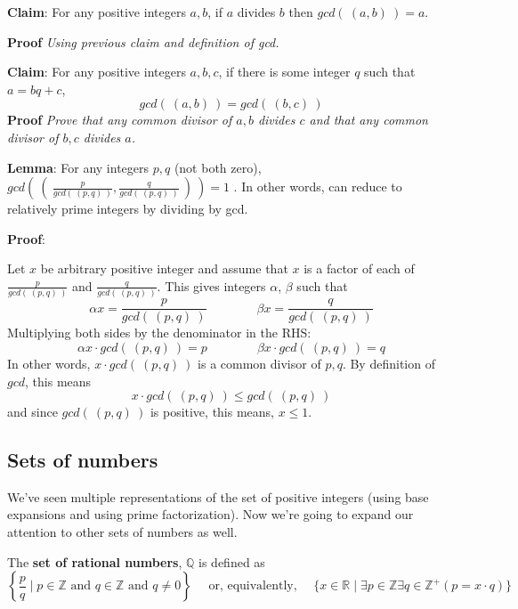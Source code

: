 \documentclass[12pt, oneside]{article}
\begin{document}
\vspace{150pt}

{\bf Claim}: For any positive integers $a,b$, if $a$ divides $b$ then $gcd(~(a,b)~) = a$.

{\bf Proof} {\it Using previous claim and definition of gcd.}

\vspace{150pt}


{\bf Claim}: For any positive integers $a,b,c$, if there is some integer $q$ such that $a = bq + c$,
\[
    gcd(~(a,b)~) = gcd (~(b,c)~)
\]
{\bf Proof} {\it Prove that any common divisor of $a,b$ divides $c$ and that any common 
divisor of $b,c$ divides $a$.}

\vspace{150pt}
 

{\bf Lemma}: For any integers $p, q$ (not both zero), 
$gcd \left(~ \left(~\frac{p}{gcd(~(p,q)~)}, \frac{q}{gcd(~(p,q)~)} ~\right) ~\right) = 1$ .
In other words, can reduce to relatively prime integers by dividing by gcd.

{\bf Proof}:

Let $x$ be arbitrary positive integer and assume that $x$ is a 
factor of each of $\frac{p}{gcd(~(p,q)~)}$ and $\frac{q}{gcd(~(p,q)~)}$. 
This gives integers $\alpha$, $\beta$ such that 
\[
    \alpha x = \frac{p}{gcd(~(p,q)~)} \qquad \qquad \beta x = \frac{q}{gcd(~(p,q)~)}
\]
Multiplying both sides by the denominator in the RHS: 
\[
    \alpha x \cdot gcd(~(p,q)~)= p \qquad \qquad \beta x \cdot gcd(~(p,q)~)= q
\]
In other words, $x \cdot gcd(~(p,q)~)$ is a common divisor of $p, q$. By definition of $gcd$, this means
\[
    x \cdot gcd (~(p,q)~) \leq gcd (~(p,q)~)
\]
and since $gcd(~(p,q)~)$ is positive, this means, $x \leq 1$.
\vspace{350pt}
 
\newpage
\subsection*{Sets of numbers}

We've seen multiple representations of the set of positive integers
(using base expansions and using prime factorization). Now we're 
going to expand our attention to other sets of numbers as well.


The {\bf set  of rational numbers}, $\mathbb{Q}$  is defined as 
\[
\left\{ \frac{p}{q} \mid p \in \mathbb{Z}  \text{ and  } q  \in \mathbb{Z} \text{ and } q \neq  0 \right\}
\text{~~~~or, equivalently,~~~~}
\{ x  \in  \mathbb{R} \mid \exists p \in \mathbb{Z}  \exists q \in \mathbb{Z}^+ ( p =  x \cdot q) \}
\]
\end{document}
